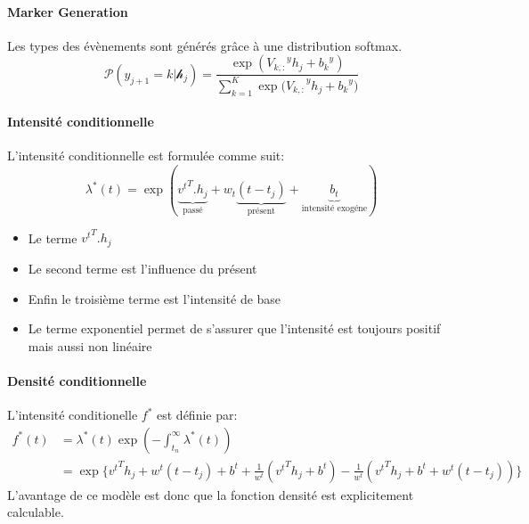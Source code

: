 \documentclass[../main.tex]{subfiles}
\begin{document}
\paragraph{Marker Generation}
Les types des évènements sont générés grâce à une distribution softmax.
\begin{equation}
\mathcal{P}(y_{j+1} = k|\mathcal{h}_j) = \frac{\exp({V_{k,:}}^y h_j + {b_k}^y)}{\sum_{k=1}^{K}{\exp(V_{k,:}}^y h_j + {b_k}^y) }
\end{equation}

\paragraph{Intensité conditionnelle}
L'intensité conditionnelle est formulée comme suit:
\begin{equation}
\lambda^*(t) = \exp(\underbrace{{v^t}^T.h_j }_{\text{passé}}+ w_t \underbrace{(t-t_j)}_{\text{présent}} +\underbrace{ b_t}_{\text{intensité exogéne}}) 
\end{equation}

\begin{itemize}
	\item Le terme ${v^t}^T.h_j$  
	\item Le second terme est l'influence du présent
	\item Enfin le troisième terme est l'intensité de base
	\item Le terme exponentiel permet de s'assurer que l'intensité est toujours positif mais aussi non linéaire  
\end{itemize}

\paragraph{Densité conditionnelle}
L'intensité conditionelle $f^*$ est définie par:
\begin{equation}
\begin{aligned}
f^*(t) &= \lambda^*(t) \exp\left(-\int_{t_n}^{\infty}  \lambda^*(t) \right) \\
&= \exp \{  {v^t  }^T h_j + w^t (t - t_j) + b^t + \frac{1}{w^t}({v^t  }^T h_j + b^t ) -  \frac{1}{w^t}({v^t  }^T h_j + b^t +w^t (t - t_j) ) \}
\end{aligned}
\end{equation}
L'avantage de ce modèle est donc que la fonction densité est explicitement calculable.
\end{document}
